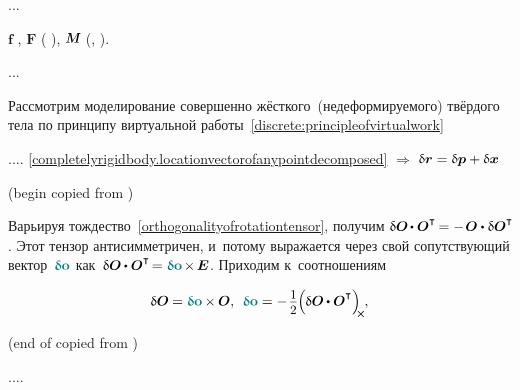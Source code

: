 ...

\noindent
{}
$\bm{f}$\ru{\:---}  ,
$\bm{F}$\ru{\:---}  (   ),
$\mathboldM$\ru{\:---}  (, ).

...

\begin{otherlanguage}{russian}

Рассмотрим моделирование совершенно жёсткого~(недеформируемого) твёрдого тела
по принципу виртуальной работы~\eqref{discrete:principleofvirtualwork}

.... \eqref{completelyrigidbody.locationvectorofanypointdecomposed} ${\Rightarrow}$
${\updelta\hspace{-0.1ex}\bm{r} = \updelta\hspace{-0.1ex}\bm{p} + \updelta\hspace{-0.1ex}\bm{x}}$

(begin copied from )

Варьируя тождество~\eqref{orthogonalityofrotationtensor}, получим ${\variation{\rotationtensor} \hspace{-0.2ex} \dotp \rotationtensor^{\T} \hspace{-0.2ex} = - \hspace{.2ex} \rotationtensor \dotp \variation{\rotationtensor}^{\T}\!}$.
Этот тензор антисимметричен, и~потому выражается через свой сопутствующий вектор~${\varvector{o}}$ как~${\variation{\rotationtensor} \hspace{-0.1ex} \dotp \rotationtensor^{\T} \hspace{-0.3ex} = \varvector{o} \hspace{-0.2ex} \times \hspace{-0.2ex} \UnitDyad}$.
Приходим к~соотношениям

\nopagebreak\vspace{-0.5em}\begin{equation}
\variation{\rotationtensor} \hspace{-0.1ex} = \varvector{o} \hspace{-0.1ex} \times \hspace{-0.1ex} \rotationtensor , \:\:
\varvector{	o} = - \hspace{.2ex} \scalebox{.93}{$ \displaystyle\onehalf $} \hspace{-0.1ex} \Bigl( \hspace{-0.1ex} \variation{\rotationtensor} \hspace{-0.1ex} \dotp \rotationtensor^{\T} \Bigr)_{\hspace{-0.25em}\Xcompanion}
\hspace{-0.1ex} ,
\end{equation}

(end of copied from )

\end{otherlanguage}

....

